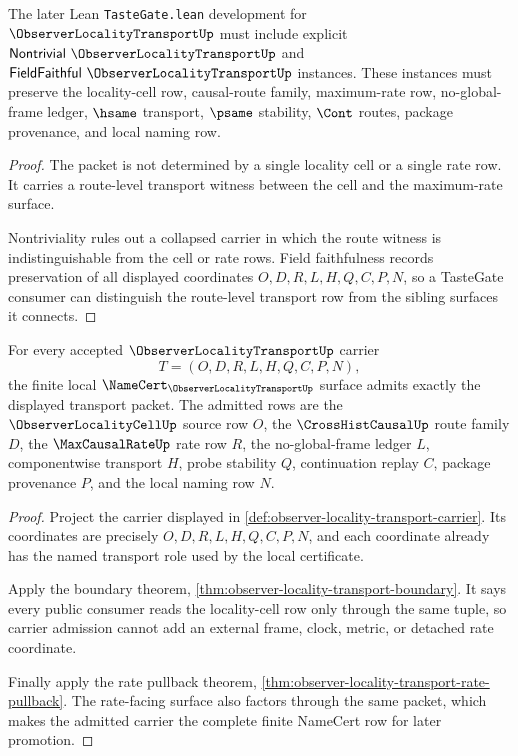 \begin{theorem}
\label{thm:observer-locality-transport-tastegate-obligation}
The later Lean \texttt{TasteGate.lean} development for $\ObserverLocalityTransportUp$ must include explicit $\mathsf{Nontrivial}\ \ObserverLocalityTransportUp$ and $\mathsf{FieldFaithful}\ \ObserverLocalityTransportUp$ instances. These instances must preserve the locality-cell row, causal-route family, maximum-rate row, no-global-frame ledger, $\hsame$ transport, $\psame$ stability, $\Cont$ routes, package provenance, and local naming row.
\end{theorem}
\begin{proof}
The packet is not determined by a single locality cell or a single rate row. It carries a route-level transport witness between the cell and the maximum-rate surface.

Nontriviality rules out a collapsed carrier in which the route witness is indistinguishable from the cell or rate rows. Field faithfulness records preservation of all displayed coordinates $O,D,R,L,H,Q,C,P,N$, so a TasteGate consumer can distinguish the route-level transport row from the sibling surfaces it connects.
\end{proof}

\begin{theorem}
\label{thm:observer-locality-transport-obligation-carrier-admission}
For every accepted $\ObserverLocalityTransportUp$ carrier
$$
T=(O,D,R,L,H,Q,C,P,N),
$$
the finite local $\NameCert_{\ObserverLocalityTransportUp}$ surface admits exactly the displayed transport packet. The admitted rows are the $\ObserverLocalityCellUp$ source row $O$, the $\CrossHistCausalUp$ route family $D$, the $\MaxCausalRateUp$ rate row $R$, the no-global-frame ledger $L$, componentwise transport $H$, probe stability $Q$, continuation replay $C$, package provenance $P$, and the local naming row $N$.
\end{theorem}
\begin{proof}
Project the carrier displayed in \autoref{def:observer-locality-transport-carrier}. Its coordinates are precisely $O,D,R,L,H,Q,C,P,N$, and each coordinate already has the named transport role used by the local certificate.

Apply the boundary theorem, \autoref{thm:observer-locality-transport-boundary}. It says every public consumer reads the locality-cell row only through the same tuple, so carrier admission cannot add an external frame, clock, metric, or detached rate coordinate.

Finally apply the rate pullback theorem, \autoref{thm:observer-locality-transport-rate-pullback}. The rate-facing surface also factors through the same packet, which makes the admitted carrier the complete finite NameCert row for later promotion.
\end{proof}

